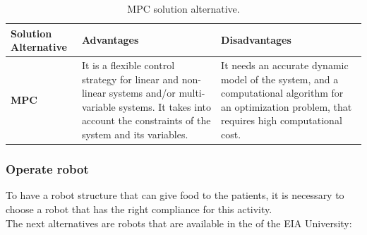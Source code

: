\documentclass[11pt]{report} %
\begin{document}
\begin{table}[H]
\begin{center}
    \begin{tabular}{M{6.6cm}M{3.3cm}M{3.3cm}}
    \hline
    \textbf{Solution Alternative} & \textbf{Advantages} & \textbf{Disadvantages} \\ 
    \hline
    
    \textbf{MPC}

    
    \citep{cite_model_predictive_control_camacho_bordons}

    &
    
    It is a flexible control strategy for linear and non-linear systems and/or multi-variable systems. It takes into account the constraints of the system and its variables.

    &
    
    It needs an accurate dynamic model of the system, and a computational algorithm for an optimization problem, that requires high computational cost.
    
    \\ \hline
    \end{tabular}
\caption{\label{tab:mpc} MPC solution alternative.}

\end{center}
\end{table}

\subsubsection{Operate robot}

To have a robot structure that can give food to the patients, it is necessary to choose a robot that has the right compliance for this activity.\\

The next alternatives are robots that are available in the  of the EIA University:\\
\end{document}
